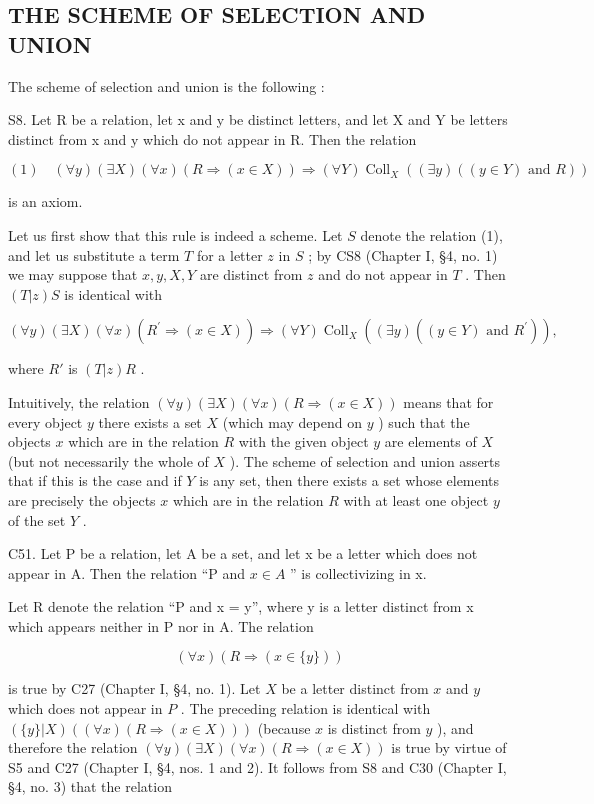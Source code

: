 \subsection{THE SCHEME OF SELECTION AND UNION}

The scheme of selection and union is the following :

S8. Let R be a relation, let x and y be distinct letters, and let X and Y be letters distinct from x and y which do not appear in R. Then the relation

\[
(1) \quad (\forall y) (\exists X) (\forall x) (R \Longrightarrow (x \in X)) \Longrightarrow (\forall Y) \operatorname{Coll} _ {X} ((\exists y) ((y \in Y) \text {   and   } R))
\]

is an axiom.

Let us first show that this rule is indeed a scheme. Let \(S\) denote the relation (1), and let us substitute a term \(T\) for a letter \(z\) in \(S\) ; by CS8 (Chapter I, §4, no. 1) we may suppose that \(x, y, X, Y\) are distinct from \(z\) and do not appear in \(T\) . Then \((T|z)S\) is identical with

\[
(\forall y) (\exists X) (\forall x) (R ^ {\prime} \Longrightarrow (x \in X)) \Longrightarrow (\forall Y) \operatorname{Coll} _ {X} ((\exists y) ((y \in Y) \text {   and   } R ^ {\prime})),
\]

where \(R'\) is \((T|z)R\) .

Intuitively, the relation \((\forall y)(\exists X)(\forall x)(R \Rightarrow (x \in X))\) means that for every object \(y\) there exists a set \(X\) (which may depend on \(y\) ) such that the objects \(x\) which are in the relation \(R\) with the given object \(y\) are elements of \(X\) (but not necessarily the whole of \(X\) ). The scheme of selection and union asserts that if this is the case and if \(Y\) is any set, then there exists a set whose elements are precisely the objects \(x\) which are in the relation \(R\) with at least one object \(y\) of the set \(Y\) .

C51. Let P be a relation, let A be a set, and let x be a letter which does not appear in A. Then the relation ``P and \(x \in A\) '' is collectivizing in x.

Let R denote the relation ``P and x = y'', where y is a letter distinct from x which appears neither in P nor in A. The relation

\[
(\forall x) (R \Longrightarrow (x \in \{y \}))
\]

is true by C27 (Chapter I, §4, no. 1). Let \(X\) be a letter distinct from \(x\) and \(y\) which does not appear in \(P\) . The preceding relation is identical with \((\{y\}|X)((\forall x)(R \Longrightarrow (x \in X)))\) (because \(x\) is distinct from \(y\) ), and therefore the relation \((\forall y)(\exists X)(\forall x)(R \Longrightarrow (x \in X))\) is true by virtue of S5 and C27 (Chapter I, §4, nos. 1 and 2). It follows from S8 and C30 (Chapter I, §4, no. 3) that the relation

